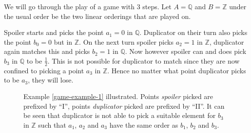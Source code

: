 \documentclass[../../main.tex]{subfiles}
\begin{document}
\begin{example}\label{game-example-1}
    We will go through the play of a game with $3$ steps. 
    Let $A = \mathbb{Q}$ and $B=\mathbb{Z}$ under the usual order be the two linear orderings that are played on.
    
    Spoiler starts and picks the point $a_1 = 0$ in $\mathbb{Q}$. Duplicator on their turn also picks the point $b_0 = 0$ but in $\mathbb{Z}$.
    On the next turn spoiler picks $a_2 = 1$ in $\mathbb{Z}$, duplicator again matches this and picks $b_2 = 1$ in $\mathbb{Q}$.
    Now however spoiler can and does pick $b_3$ in $\mathbb{Q}$ to be $\frac{1}{2}$. 
    This is not possible for duplicator to match since they are now confined to picking a point $a_3$ in $\mathbb{Z}$.
    Hence no matter what point duplicator picks to be $a_3$, they will lose.
\end{example}

\begin{figure}[h]
    \centering
    \caption{Example \ref{game-example-1} illustrated.
    Points \textit{spoiler} picked are prefixed by ``I'', points \textit{duplicator} picked are prefixed by ``II''.
    It can be seen that duplicator is not able to pick a suitable element for $b_3$ in $\mathbb{Z}$ such that $a_1$, $a_2$ and $a_3$ have the same order as $b_1$, $b_2$ and $b_3$.}
\end{figure}
\end{document}
